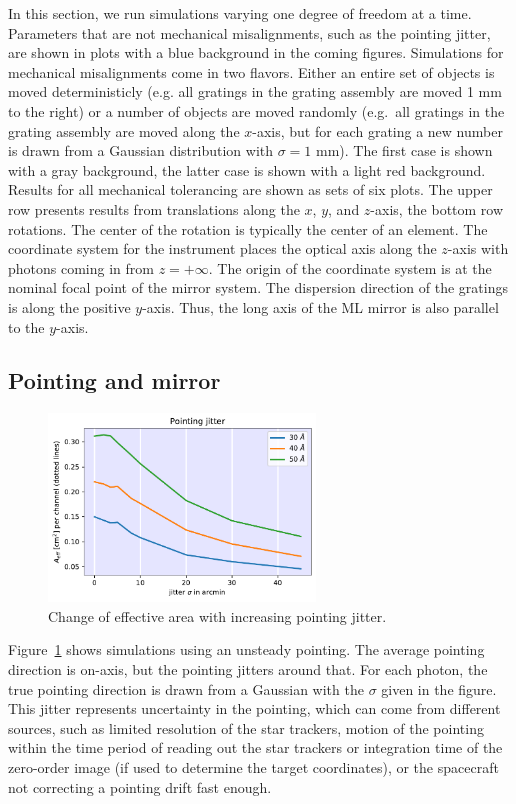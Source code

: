 \documentclass[]{spie}  %
\begin{document}
In this section, we run simulations varying one degree of freedom at a
time. Parameters that are not mechanical misalignments, such as the
pointing jitter, are shown in plots with a blue background in the
coming figures. Simulations for mechanical misalignments come in two
flavors. Either an entire set of objects is moved deterministicly
(e.g. all gratings in the grating assembly are moved 1 mm to the
right) or a number of objects are moved randomly (e.g.\ all gratings in
the grating assembly are moved along the $x$-axis, but for each
grating a new number is drawn from a Gaussian distribution with
$\sigma=1$ mm). The first case is shown with a gray background, the
latter case is shown with a light red background. Results for all mechanical
tolerancing are shown as sets of six plots. The upper row presents
results from translations along the $x$, $y$, and $z$-axis, the bottom
row rotations. The center of the rotation is typically the center of
an element. The coordinate system for the instrument places the optical axis
along the $z$-axis with photons coming in from $z=+\infty$. The origin
of the coordinate system is at the nominal focal point of the mirror
system. The dispersion direction of the gratings is along the positive
$y$-axis. Thus, the long axis of the ML mirror is also parallel to the
$y$-axis.

\subsection{Pointing and mirror}
\begin{figure} [ht]
  \begin{center}
    \includegraphics[height=5cm]{jitter.pdf}
  \end{center}
  \caption
      { \label{fig:jitter}Change of effective area with increasing pointing jitter. 
}
\end{figure}

Figure~\ref{fig:jitter} shows simulations using an unsteady
pointing. The average pointing direction is on-axis, but the pointing
jitters around that. For each photon, the true pointing direction is
drawn from a Gaussian with the $\sigma$ given in the figure. This
jitter represents uncertainty in the pointing, which can come from
different sources, such as limited resolution of the star trackers,
motion of the pointing within the time period of reading out the star
trackers or integration time of the zero-order image (if used to
determine the target coordinates), or the spacecraft not correcting a
pointing drift fast enough.
\end{document}
